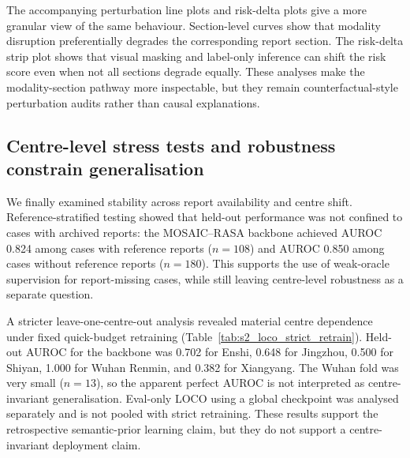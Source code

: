 The accompanying perturbation line plots and risk-delta plots give a more granular view of the same behaviour. Section-level curves show that modality disruption preferentially degrades the corresponding report section. The risk-delta strip plot shows that visual masking and label-only inference can shift the risk score even when not all sections degrade equally. These analyses make the modality-section pathway more inspectable, but they remain counterfactual-style perturbation audits rather than causal explanations.

\FloatBarrier

\subsection{Centre-level stress tests and robustness constrain generalisation}
\label{subsec:loco_results}

We finally examined stability across report availability and centre shift. Reference-stratified testing showed that held-out performance was not confined to cases with archived reports: the MOSAIC--RASA backbone achieved AUROC 0.824 among cases with reference reports (\(n=108\)) and AUROC 0.850 among cases without reference reports (\(n=180\)). This supports the use of weak-oracle supervision for report-missing cases, while still leaving centre-level robustness as a separate question.

A stricter leave-one-centre-out analysis revealed material centre dependence under fixed quick-budget retraining (Table~\ref{tab:s2_loco_strict_retrain}). Held-out AUROC for the backbone was 0.702 for Enshi, 0.648 for Jingzhou, 0.500 for Shiyan, 1.000 for Wuhan Renmin, and 0.382 for Xiangyang. The Wuhan fold was very small (\(n=13\)), so the apparent perfect AUROC is not interpreted as centre-invariant generalisation. Eval-only LOCO using a global checkpoint was analysed separately and is not pooled with strict retraining. These results support the retrospective semantic-prior learning claim, but they do not support a centre-invariant deployment claim.

